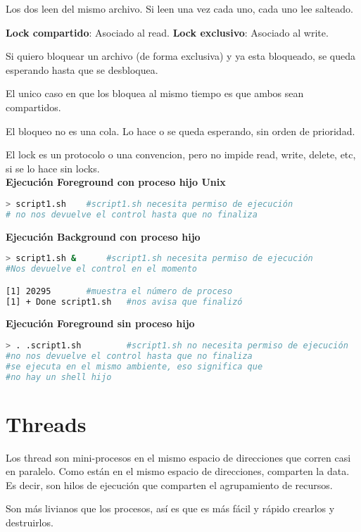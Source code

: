 \documentclass[a4paper, twoside]{article}
\begin{document}
Los dos leen del mismo archivo. Si leen una vez cada uno, cada uno lee salteado.

\textbf{Lock compartido}: Asociado al read.
\textbf{Lock exclusivo}: Asociado al write.

Si quiero bloquear un archivo (de forma exclusiva) y ya esta bloqueado, se queda esperando hasta que se desbloquea.

El unico caso en que los bloquea al mismo tiempo es que ambos sean compartidos.

El bloqueo no es una cola. Lo hace o se queda esperando, sin orden de prioridad.

El lock es un protocolo o una convencion, pero no impide read, write, delete, etc, si se lo hace sin locks.\\

\textbf{Ejecución Foreground con proceso hijo Unix}
\begin{lstlisting}[language=sh]
> script1.sh 	#script1.sh necesita permiso de ejecución
# no nos devuelve el control hasta que no finaliza
\end{lstlisting}

\textbf{Ejecución Background con proceso hijo}
\begin{lstlisting}[language=sh]
> script1.sh & 		#script1.sh necesita permiso de ejecución
#Nos devuelve el control en el momento

[1] 20295 		#muestra el número de proceso
[1] + Done script1.sh 	#nos avisa que finalizó
\end{lstlisting}

\textbf{Ejecución Foreground sin proceso hijo}
\begin{lstlisting}[language=sh]
> . .script1.sh 		#script1.sh no necesita permiso de ejecución
#no nos devuelve el control hasta que no finaliza
#se ejecuta en el mismo ambiente, eso significa que
#no hay un shell hijo
\end{lstlisting}

\newpage
\section{Threads}
Los thread son mini-procesos en el mismo espacio de direcciones que corren casi en paralelo. Como están en el mismo espacio de direcciones, comparten la data. Es decir, son hilos de ejecución que comparten el agrupamiento de recursos.

Son más livianos que los procesos, así es que es más fácil y rápido crearlos y destruirlos.\\
\end{document}
